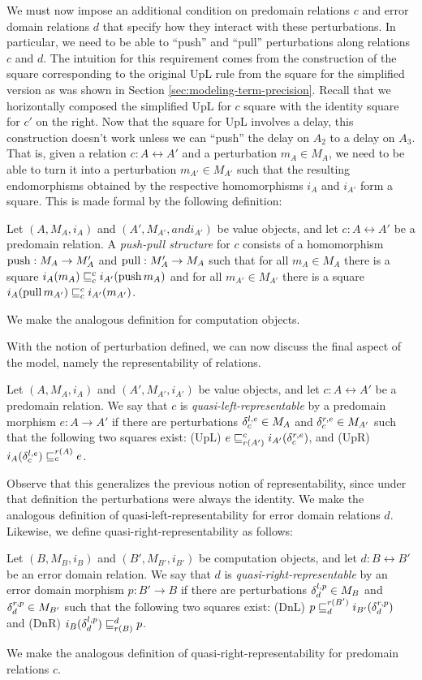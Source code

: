 We must now impose an additional condition on predomain relations $c$ and error
domain relations $d$ that specify how they interact with these perturbations. In
particular, we need to be able to ``push'' and ``pull'' perturbations along
relations $c$ and $d$. The intuition for this requirement comes from the
construction of the square corresponding to the original UpL rule from the
square for the simplified version as was shown in Section
\ref{sec:modeling-term-precision}. Recall that we horizontally composed the
simplified UpL for $c$ square with the identity square for $c'$ on the right.
Now that the square for UpL involves a delay, this construction doesn't work
unless we can ``push'' the delay on $A_2$ to a delay on $A_3$. That is, given a
relation $c : A \rel A'$ and a perturbation $m_A \in M_A$, we need to be able to
turn it into a perturbation $m_{A'} \in M_{A'}$ such that the resulting
endomorphisms obtained by the respective homomorphisms $i_A$ and $i_{A'}$ form a
square. This is made formal by the following definition:
%
\begin{definition}
    Let $(A, M_A, i_A)$ and $(A', M_{A'}, and i_{A'})$ be value objects, and let
    $c : A \rel A'$ be a predomain relation. A \emph{push-pull structure} for
    $c$ consists of a homomorphism $\text{push} : M_A \to M_A'$ and $\text{pull} : M_A' \to
    M_A$ such that for all $m_A \in M_A$ there is a square $i_A(m_A) \mathrel{\sqsubseteq^{c}_{c}}
    i_{A'}(\text{push}\, m_A)$ and for all $m_{A'} \in M_{A'}$ there is a square
    $i_A(\text{pull}\, m_{A'}) \mathrel{\sqsubseteq^{c}_{c}} i_{A'}(m_{A'})$.
\end{definition}
%
We make the analogous definition for computation objects.

With the notion of perturbation defined, we can now discuss the final aspect of
the model, namely the representability of relations.
%
\begin{definition}
Let $(A, M_A, i_A)$ and $(A', M_{A'}, i_{A'})$ be value objects, and let $c : A
\rel A'$ be a predomain relation. We say that $c$ is
\emph{quasi-left-representable} by a predomain morphism $e : A \to A'$ if there
are perturbations $\delta^{l,e}_c \in M_A$ and $\delta^{r,e}_c \in M_{A'}$ such that the
following two squares exist: (UpL) $e \mathrel{\sqsubseteq^{c}_{r(A')}} i_{A'}(\delta^{r,e}_c)$, and
(UpR) $i_A(\delta^{l,e}_c) \mathrel{\sqsubseteq^{r(A)}_{c}} e$.
\end{definition}
%
Observe that this generalizes the previous notion of representability, since
under that definition the perturbations were always the identity.
%
We make the analogous definition of quasi-left-representability for error domain
relations $d$.
%
Likewise, we define quasi-right-representability as follows:
%
\begin{definition}
Let $(B, M_B, i_B)$ and $(B', M_{B'}, i_{B'})$ be computation objects, and let
$d : B \rel B'$ be an error domain relation. We say that $d$ is
\emph{quasi-right-representable} by an error domain morphism $p : B' \to B$ if
there are perturbations $\delta^{l,p}_d \in M_B$ and $\delta^{r,p}_d \in M_{B'}$ such that
the following two squares exist: 
(DnL) $p \mathrel{\sqsubseteq^{r(B')}_{d}} i_{B'}(\delta^{r,p}_d)$ and
(DnR) $i_B(\delta^{l,p}_d) \mathrel{\sqsubseteq^{d}_{r(B)}} p$.
\end{definition}
%
We make the analogous definition of quasi-right-representability for predomain
relations $c$.

